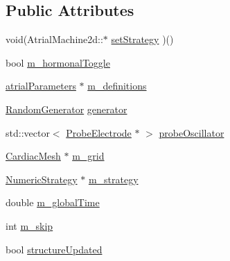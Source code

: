 \subsection*{Public Attributes}
\begin{DoxyCompactItemize}
\item 
void(Atrial\+Machine2d\+::$\ast$ \hyperlink{class_atrial_machine2d_aaeb0690b1fbd433bd0c25f2162b7b4bb}{set\+Strategy} )()
\item 
bool \hyperlink{class_atrial_machine2d_a784a6fb0c363c6858e992957279a28ea}{m\+\_\+hormonal\+Toggle}
\item 
\hyperlink{classatrial_parameters}{atrial\+Parameters} $\ast$ \hyperlink{class_atrial_machine2d_aeafb998f5621fb19749014161d7d600d}{m\+\_\+definitions}
\item 
\hyperlink{class_random_generator}{Random\+Generator} \hyperlink{class_atrial_machine2d_a4ee41f8430aca76d5c6411cd37c92d38}{generator}
\item 
std\+::vector$<$ \hyperlink{class_probe_electrode}{Probe\+Electrode} $\ast$ $>$ \hyperlink{class_atrial_machine2d_a524fc9fd5d07a9f6f93611ee7839c99c}{probe\+Oscillator}
\item 
\hyperlink{class_cardiac_mesh}{Cardiac\+Mesh} $\ast$ \hyperlink{class_atrial_machine2d_ae5a4568a32980b04648791e7ac5e3249}{m\+\_\+grid}
\item 
\hyperlink{class_numeric_strategy}{Numeric\+Strategy} $\ast$ \hyperlink{class_atrial_machine2d_afa218ce1cafcf45895c0317953b97977}{m\+\_\+strategy}
\item 
double \hyperlink{class_atrial_machine2d_a951f2f5f1bee9505ee93df61121bf5d2}{m\+\_\+global\+Time}
\item 
int \hyperlink{class_atrial_machine2d_a08a7d022fbd6733e52775651b5f139dc}{m\+\_\+skip}
\item 
bool \hyperlink{class_atrial_machine2d_a9d4b451c3384c6cac71bd06662e30b55}{structure\+Updated}
\end{DoxyCompactItemize}


